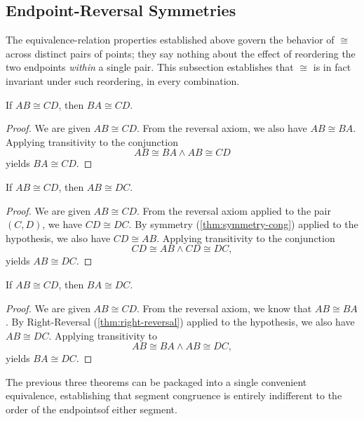 \documentclass[../../../main/main.tex]{subfiles}
\begin{document}
\subsection{Endpoint-Reversal Symmetries}

The equivalence-relation properties established above govern the behavior of $\cong$ across distinct pairs of points; they say nothing about the effect of reordering the two endpoints \emph{within} a single pair. This subsection establishes that $\cong$ is in fact invariant under such reordering, in every combination.

\begin{theorem}
    If $AB \cong CD$, then $BA \cong CD$.
\end{theorem}
\begin{proof}
    We are given $AB \cong CD$. From the reversal axiom, we also have $AB \cong BA$. Applying transitivity to the conjunction
    \[
    AB \cong BA \land AB \cong CD
    \]
    yields $BA \cong CD$.
\end{proof}

\begin{theorem}\label{thm:right-reversal}
    If $AB \cong CD$, then $AB \cong DC$.
\end{theorem}
\begin{proof}
    We are given $AB \cong CD$. From the reversal axiom applied to the pair $(C,D)$, we have $CD \cong DC$. By symmetry (\autoref{thm:symmetry-cong}) applied to the hypothesis, we also have $CD \cong AB$. Applying transitivity to the conjunction
    \[
    CD \cong AB \land CD \cong DC,
    \]
    yields $AB \cong DC$.
\end{proof}

\begin{theorem}\label{thm:full-reversal}
    If $AB \cong CD$, then $BA \cong DC$.
\end{theorem}
\begin{proof}
    We are given $AB \cong CD$. From the reversal axiom, we know that $AB \cong BA$. By Right-Reversal (\autoref{thm:right-reversal}) applied to the hypothesis, we also have $AB \cong DC$. Applying transitivity to
    \[
    AB \cong BA \land AB \cong DC,
    \]
    yields $BA \cong DC$.
\end{proof}

The previous three theorems can be packaged into a single convenient equivalence,
establishing that segment congruence is entirely indifferent to the order of the endpointsof either segment.
\end{document}
